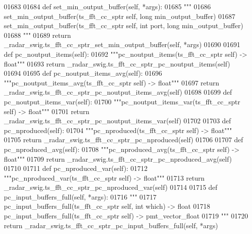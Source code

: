 \begin{DoxyCode}
{{{{{{{01683 
01684     \textcolor{keyword}{def }set_min_output_buffer(self, *args):
01685         \textcolor{stringliteral}{"""}
01686 \textcolor{stringliteral}{        set\_min\_output\_buffer(ts\_fft\_cc\_sptr self, long min\_output\_buffer)}
01687 \textcolor{stringliteral}{        set\_min\_output\_buffer(ts\_fft\_cc\_sptr self, int port, long min\_output\_buffer)}
01688 \textcolor{stringliteral}{        """}
01689         \textcolor{keywordflow}{return} \_radar\_swig.ts\_fft\_cc\_sptr\_set\_min\_output\_buffer(self, *args)
01690 
01691     \textcolor{keyword}{def }pc_noutput_items(self):
01692         \textcolor{stringliteral}{"""pc\_noutput\_items(ts\_fft\_cc\_sptr self) -> float"""}
01693         \textcolor{keywordflow}{return} \_radar\_swig.ts\_fft\_cc\_sptr\_pc\_noutput\_items(self)
01694 
01695     \textcolor{keyword}{def }pc_noutput_items_avg(self):
01696         \textcolor{stringliteral}{"""pc\_noutput\_items\_avg(ts\_fft\_cc\_sptr self) -> float"""}
01697         \textcolor{keywordflow}{return} \_radar\_swig.ts\_fft\_cc\_sptr\_pc\_noutput\_items\_avg(self)
01698 
01699     \textcolor{keyword}{def }pc_noutput_items_var(self):
01700         \textcolor{stringliteral}{"""pc\_noutput\_items\_var(ts\_fft\_cc\_sptr self) -> float"""}
01701         \textcolor{keywordflow}{return} \_radar\_swig.ts\_fft\_cc\_sptr\_pc\_noutput\_items\_var(self)
01702 
01703     \textcolor{keyword}{def }pc_nproduced(self):
01704         \textcolor{stringliteral}{"""pc\_nproduced(ts\_fft\_cc\_sptr self) -> float"""}
01705         \textcolor{keywordflow}{return} \_radar\_swig.ts\_fft\_cc\_sptr\_pc\_nproduced(self)
01706 
01707     \textcolor{keyword}{def }pc_nproduced_avg(self):
01708         \textcolor{stringliteral}{"""pc\_nproduced\_avg(ts\_fft\_cc\_sptr self) -> float"""}
01709         \textcolor{keywordflow}{return} \_radar\_swig.ts\_fft\_cc\_sptr\_pc\_nproduced\_avg(self)
01710 
01711     \textcolor{keyword}{def }pc_nproduced_var(self):
01712         \textcolor{stringliteral}{"""pc\_nproduced\_var(ts\_fft\_cc\_sptr self) -> float"""}
01713         \textcolor{keywordflow}{return} \_radar\_swig.ts\_fft\_cc\_sptr\_pc\_nproduced\_var(self)
01714 
01715     \textcolor{keyword}{def }pc_input_buffers_full(self, *args):
01716         \textcolor{stringliteral}{"""}
01717 \textcolor{stringliteral}{        pc\_input\_buffers\_full(ts\_fft\_cc\_sptr self, int which) -> float}
01718 \textcolor{stringliteral}{        pc\_input\_buffers\_full(ts\_fft\_cc\_sptr self) -> pmt\_vector\_float}
01719 \textcolor{stringliteral}{        """}
01720         \textcolor{keywordflow}{return} \_radar\_swig.ts\_fft\_cc\_sptr\_pc\_input\_buffers\_full(self, *args)
}}}}}}}
\end{DoxyCode}

